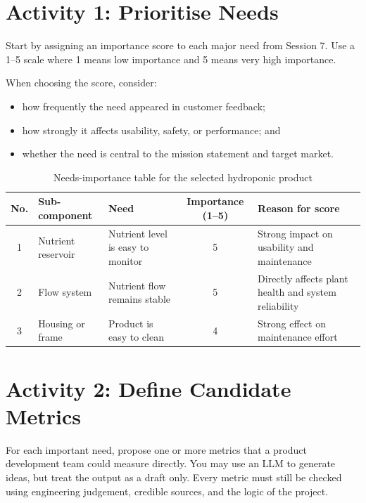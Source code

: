 \section{Activity 1: Prioritise Needs}

Start by assigning an importance score to each major need from Session 7. Use a 1--5 scale where 1 means low importance and 5 means very high importance.

When choosing the score, consider:
\begin{itemize}
    \item how frequently the need appeared in customer feedback;
    \item how strongly it affects usability, safety, or performance; and
    \item whether the need is central to the mission statement and target market.
\end{itemize}

\begin{table}[htbp]
\centering
\caption{Needs-importance table for the selected hydroponic product}
\label{tab:session8-needs-importance}
\renewcommand{\arraystretch}{1.2}
\begin{tabularx}{\textwidth}{|c|>{\raggedright\arraybackslash}p{}|>{\raggedright\arraybackslash}X|c|>{\raggedright\arraybackslash}p{}|}
\hline
\textbf{No.} & \textbf{Sub-component} & \textbf{Need} & \textbf{Importance (1--5)} & \textbf{Reason for score} \\
\hline
1 & Nutrient reservoir & Nutrient level is easy to monitor & 5 & Strong impact on usability and maintenance \\
\hline
2 & Flow system & Nutrient flow remains stable & 5 & Directly affects plant health and system reliability \\
\hline
3 & Housing or frame & Product is easy to clean & 4 & Strong effect on maintenance effort \\
\hline
\end{tabularx}
\end{table}

\section{Activity 2: Define Candidate Metrics}

For each important need, propose one or more metrics that a product development team could measure directly. You may use an LLM to generate ideas, but treat the output as a draft only. Every metric must still be checked using engineering judgement, credible sources, and the logic of the project.

